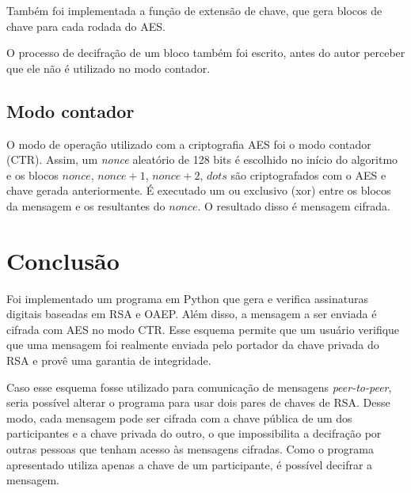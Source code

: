 \documentclass[a4paper, 10.5pt]{article}
\begin{document}
Também foi implementada a função de extensão de chave, que gera blocos de chave
para cada rodada do AES.

O processo de decifração de um bloco também foi escrito, antes do autor perceber que ele não é utilizado no modo contador.

\subsection{Modo contador} %
\label{sec:ctr}
    O modo de operação utilizado com a criptografia AES foi o modo contador (CTR).
    Assim, um \textit{nonce} aleatório de 128 bits é escolhido no início do
    algoritmo e os blocos $nonce$, $nonce+1$, $nonce+2$, $dots$ são
    criptografados com o AES e chave gerada anteriormente. É executado um ou
    exclusivo (xor) entre os blocos da mensagem e os resultantes do $nonce$. O
    resultado disso é mensagem cifrada.

    

\section{Conclusão} %
\label{sec:conclusao}
    Foi implementado um programa em Python que gera e verifica assinaturas
    digitais baseadas em RSA e OAEP. Além disso, a mensagem a ser enviada é
    cifrada com AES no modo CTR. Esse esquema permite que um usuário verifique
    que uma mensagem foi realmente enviada pelo portador da chave privada do RSA
    e provê uma garantia de integridade.

    Caso esse esquema fosse utilizado para comunicação de mensagens
    \textit{peer-to-peer}, seria possível alterar o programa para usar dois
    pares de chaves de RSA. Desse modo, cada mensagem pode ser cifrada com a
    chave pública de um dos participantes e a chave privada do outro, o que
    impossibilita a decifração por outras pessoas que tenham acesso às mensagens
    cifradas. Como o programa apresentado utiliza apenas a chave de um
    participante, é possível decifrar a mensagem.
    

% 


\end{document}
